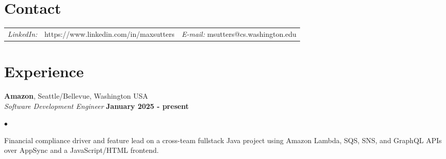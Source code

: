 \documentclass[margin,line]{res}
\newenvironment{list2}{
  \begin{list}{$\bullet$}{%
      \setlength{\itemsep}{0in}
      \setlength{\parsep}{0in} \setlength{\parskip}{0in}
      \setlength{\topsep}{0in} \setlength{\partopsep}{0in} 
      \setlength{\leftmargin}{0.2in}}}{\end{list}}
\begin{document}
\thispagestyle{empty}


\begin{resume}
\section{\sc Contact} %
\vspace{.05in}
\begin{tabular}{@{}p{0.5in}p{2.5in}p{3in}}
{\it LinkedIn:} & https://www.linkedin.com/in/maxsutters & {\it E-mail:}  msutters@cs.washington.edu \\   
\end{tabular}

\section{\sc Experience}

{\bf Amazon}, Seattle/Bellevue, Washington USA \\
{\em Software Development Engineer} \hfill {\bf January 2025 - present} \\
% 
\begin{list2}
\item Financial compliance driver and feature lead on a cross-team fullstack Java project using Amazon Lambda, SQS, SNS, and GraphQL APIs over AppSync and a JavaScript/HTML frontend.
\end{list2}


\end{resume}
\end{document}
